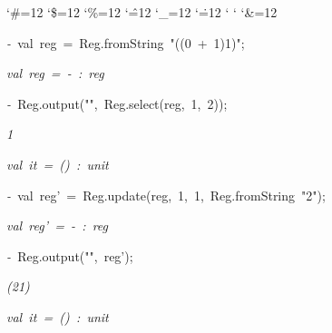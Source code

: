 \begin{list}{}
{\setlength{\leftmargin}{\leftmargini}
\setlength{\rightmargin}{0cm}
\setlength{\itemindent}{0cm}
\setlength{\listparindent}{0cm}
\setlength{\itemsep}{0cm}
\setlength{\parsep}{0cm}
\setlength{\labelsep}{0cm}
\setlength{\labelwidth}{0cm}
\catcode`\#=12
\catcode`\$=12
\catcode`\%=12
\catcode`\^=12
\catcode`\_=12
\catcode`\.=12
\catcode`
\catcode`
\catcode`\&=12
\ttfamily}
\small
\item[]\textsl{-\ }val\ reg\ =\ Reg.fromString\ "((0\ +\ 1)1)";
\item[]\textsl{val\ reg\ =\ -\ :\ reg}
\item[]\textsl{-\ }Reg.output("",\ Reg.select(reg,\ 1,\ 2));
\item[]\textsl{1}
\item[]\textsl{val\ it\ =\ ()\ :\ unit}
\item[]\textsl{-\ }val\ reg'\ =\ Reg.update(reg,\ 1,\ 1,\ Reg.fromString\ "2");
\item[]\textsl{val\ reg'\ =\ -\ :\ reg}
\item[]\textsl{-\ }Reg.output("",\ reg');
\item[]\textsl{(21)}
\item[]\textsl{val\ it\ =\ ()\ :\ unit}
\end{list}
